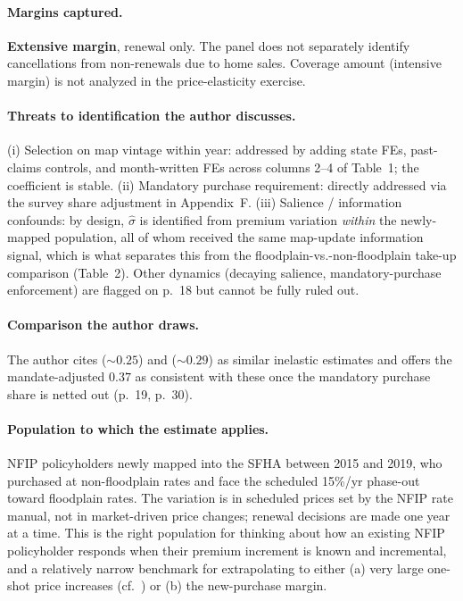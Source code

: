 \documentclass[11pt]{article}
\begin{document}
\paragraph{Margins captured.}
\textbf{Extensive margin}, renewal only. The panel does not separately
identify cancellations from non-renewals due to home sales. Coverage
amount (intensive margin) is not analyzed in the price-elasticity
exercise.

\paragraph{Threats to identification the author discusses.}
(i) Selection on map vintage within year: addressed by adding state FEs,
past-claims controls, and month-written FEs across columns 2--4 of
Table~1; the coefficient is stable.
(ii) Mandatory purchase requirement: directly addressed via the survey
share adjustment in Appendix~F.
(iii) Salience / information confounds: by design, $\hat\sigma$ is
identified from premium variation \emph{within} the newly-mapped
population, all of whom received the same map-update information signal,
which is what separates this from the floodplain-vs.-non-floodplain
take-up comparison (Table~2). Other dynamics (decaying salience,
mandatory-purchase enforcement) are flagged on p.~18 but cannot be
fully ruled out.

\paragraph{Comparison the author draws.}
The author cites \citet{bradt2021} ($\sim 0.25$) and \citet{wagner2022}
($\sim 0.29$) as similar inelastic estimates and offers the
mandate-adjusted $0.37$ as consistent with these once the mandatory
purchase share is netted out (p.~19, p.~30).

\paragraph{Population to which the estimate applies.}
NFIP policyholders newly mapped into the SFHA between 2015 and 2019, who
purchased at non-floodplain rates and face the scheduled 15\%/yr phase-out
toward floodplain rates. The variation is in scheduled prices set by the
NFIP rate manual, not in market-driven price changes; renewal decisions
are made one year at a time. This is the right population for thinking
about how an existing NFIP policyholder responds when their premium
increment is known and incremental, and a relatively narrow benchmark for
extrapolating to either (a) very large one-shot price increases (cf.\
\citet{collier2026}) or (b) the new-purchase margin.
\end{document}
